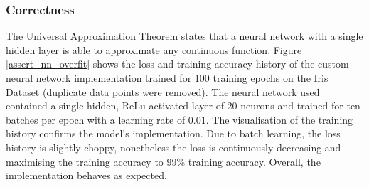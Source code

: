 \subsubsection{Correctness}

The Universal Approximation Theorem \cite{universal_aprox_theorem} states that a neural network with a single hidden layer is able to approximate any continuous function. Figure \ref{assert_nn_overfit} shows the loss and training accuracy history of the custom neural network implementation trained for 100 training epochs on the Iris Dataset (duplicate data points were removed). The neural network used contained a single hidden, ReLu activated layer of 20 neurons and trained for ten batches per epoch with a learning rate of 0.01. The visualisation of the training history confirms the model's implementation. Due to batch learning, the loss history is slightly choppy, nonetheless the loss is continuously decreasing and maximising the training accuracy to 99\% training accuracy. Overall, the implementation behaves as expected. 

